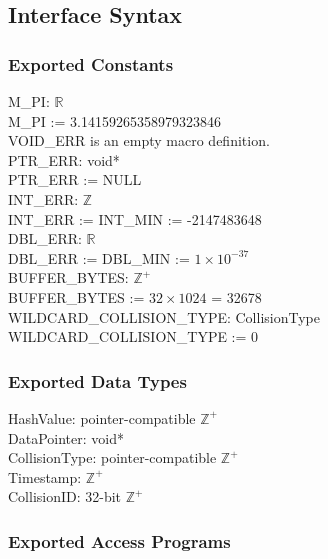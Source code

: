 \documentclass[12pt]{article}
\newcommand{\R}{$\mathbb{R}$}
\newcommand{\Z}{$\mathbb{Z}$}
\newcommand{\UZ}{$\mathbb{Z}^+$}
\begin{document}
\subsection{Interface Syntax}

\subsubsection{Exported Constants} \label{SecECControl}
	M_PI: \R \\
	M_PI := 3.14159265358979323846 \\
	\newline
	VOID_ERR is an empty macro definition. \\
	\newline
	PTR_ERR: void* \\
	PTR_ERR := NULL \\
	\newline
	INT_ERR: \Z \\
	INT_ERR := INT_MIN := -2147483648 \\
	\newline
	DBL_ERR: \R \\
	DBL_ERR := DBL_MIN := $1 \times 10^{-37}$ \\
	\newline
	BUFFER_BYTES: \UZ \\
	BUFFER_BYTES := $32 \times 1024$ = 32678 \\
	\newline
	WILDCARD_COLLISION_TYPE: CollisionType \\
	WILDCARD_COLLISION_TYPE := 0 
	

\subsubsection{Exported Data Types} \label{SecEDTControl}
	HashValue: pointer-compatible \UZ \\
	DataPointer: void* \\
	CollisionType: pointer-compatible \UZ \\
	Timestamp: \UZ \\
	CollisionID: 32-bit \UZ

\subsubsection{Exported Access Programs} \label{SecEAPControl}
	\iffalse
	Due to the way strings are represented in C, all strings in the following table are equivalent to a pointer to a constant character array (const char*).
	\fi
\end{document}
